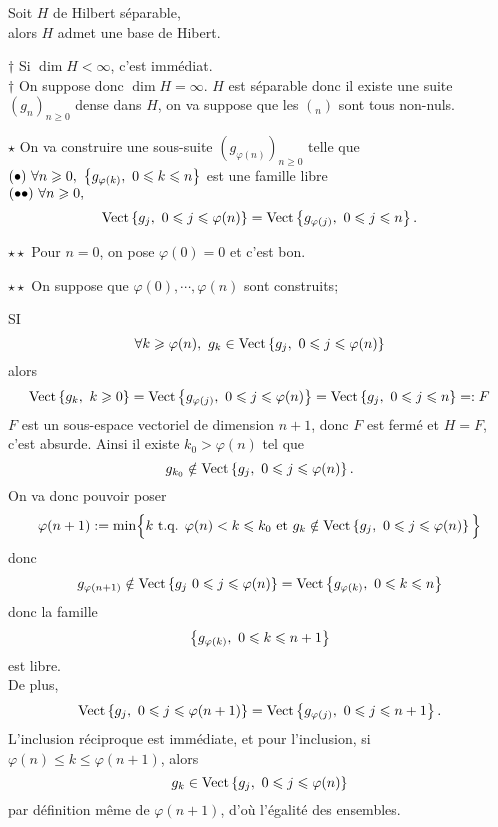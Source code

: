 \documentclass[a4paper,11pt, twoside]{article}
\begin{document}
\begin{Th}
  Soit $H$ de Hilbert séparable,\\
  
  alors $H$ admet une base de Hibert.
\end{Th}


\begin{Proof}
  $\dagger$ Si $\dim H<\infty$, c'est immédiat.\\

  $\dagger$ On suppose donc $\dim H=\infty$. $H$ est séparable donc il existe une suite $(g_n)_{n\geqslant 0}$ dense dans $H$, on va suppose que les $(_n)$ sont tous non-nuls. 

  $\star$ On va construire une sous-suite $(g_{\varphi(n)})_{n\geqslant 0}$ telle que\\
  $\Bullet\ \forall n\geqslant 0,\ \ens{g_{\varphi(k)},\ 0\leqslant k\leqslant n}$ est une famille libre\\
  $(\bullet\bullet)\ \forall n\geqslant 0,$
  $$\mathrm{Vect}\left\{g_j,\ 0\leqslant j\leqslant \varphi(n)\right\}=\mathrm{Vect}\left\{g_{\varphi(j)},\ 0\leqslant j\leqslant n\right\}.$$

  $\star\star$ Pour $n=0$, on pose $\varphi(0)=0$ et c'est bon.

  $\star\star$ On suppose que $\varphi(0),\cdots,\varphi(n)$ sont construits;

  SI 
  $$\forall k\geqslant \varphi(n),\ g_k\in \mathrm{Vect}\ens{g_j,\ 0\leqslant j\leqslant \varphi(n)}$$ 
  alors
  $$\mathrm{Vect}\left\{g_k,\ k\geqslant 0\right\}=\mathrm{Vect}\left\{g_{\varphi(j)},\ 0\leqslant j\leqslant \varphi(n)\right\}=\mathrm{Vect}\left\{g_j,\ 0\leqslant j\leqslant n\right\}=:F$$
  $F$ est un sous-espace vectoriel de dimension $n+1$, donc $F$ est fermé et $H=F$, c'est absurde. Ainsi il existe $k_0>\varphi(n)$ tel que 
  $$g_{k_0}\notin \mathrm{Vect}\left\{g_j,\ 0\leqslant j\leqslant \varphi(n)\right\}.$$
  On va donc pouvoir poser 
  $$\varphi(n+1):=\mathrm{min}\Big\{k\text{ t.q. }\varphi(n)<k\leqslant k_0\text{ et }g_{k}\notin \mathrm{Vect}\left\{g_j,\ 0\leqslant j\leqslant \varphi(n)\right\}\Big\}$$
  donc
  $$g_{\varphi(n+1)}\notin \mathrm{Vect}\ens{g_j\ 0\leqslant j\leqslant \varphi(n)}=\mathrm{Vect}\ens{g_{\varphi(k)},\ 0\leqslant k\leqslant n}$$
  donc la famille 
  $$\left\{g_{\varphi(k)},\ 0\leqslant k\leqslant n+1\right\}$$
  est libre.\\

  De plus, 
  $$\mathrm{Vect}\left\{g_j,\ 0\leqslant j\leqslant \varphi(n+1)\right\}=\mathrm{Vect}\left\{g_{\varphi(j)},\ 0\leqslant j\leqslant n+1\right\}.$$
  L'inclusion réciproque est immédiate, et pour l'inclusion, si $\varphi(n)\leqslant k\leqslant \varphi(n+1)$, alors 
  $$g_k\in\mathrm{Vect}\ens{g_j,\ 0\leqslant j\leqslant \varphi(n)}$$
  par définition même de $\varphi(n+1)$, d'où l'égalité des ensembles.\\


\end{Proof}
\end{document}

